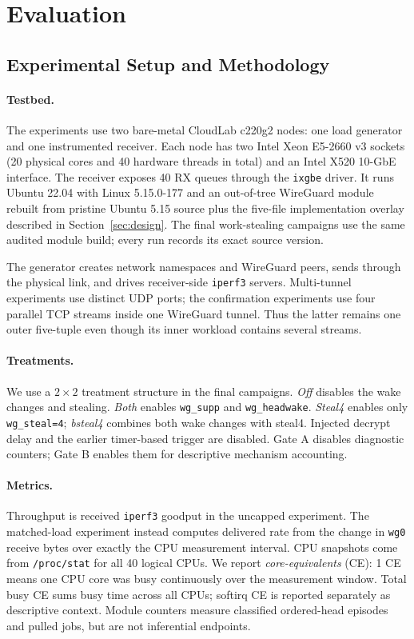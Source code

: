 \section{Evaluation}
\label{sec:evaluation}
\begingroup
\setlength{\emergencystretch}{1.5em}

\subsection{Experimental Setup and Methodology}
\label{sec:eval-method}

\paragraph{Testbed.}
The experiments use two bare-metal CloudLab c220g2 nodes: one load generator and
one instrumented receiver.  Each node has two Intel Xeon E5-2660 v3 sockets
(20 physical cores and 40 hardware threads in total) and an Intel X520 10-GbE
interface.  The receiver exposes 40 RX queues through the \texttt{ixgbe}
driver.  It runs Ubuntu 22.04 with Linux 5.15.0-177 and an out-of-tree
WireGuard module rebuilt from pristine Ubuntu 5.15 source plus the five-file
implementation overlay described in Section~\ref{sec:design}.  The final
work-stealing campaigns use the same audited module build; every run records
its exact source version.

The generator creates network namespaces and WireGuard peers, sends through the
physical link, and drives receiver-side \texttt{iperf3} servers.  Multi-tunnel
experiments use distinct UDP ports; the confirmation experiments use four
parallel TCP streams inside one WireGuard tunnel.  Thus the latter remains one
outer five-tuple even though its inner workload contains several streams.

\paragraph{Treatments.}
We use a $2\times2$ treatment structure in the final campaigns.  \emph{Off}
disables the wake changes and stealing.  \emph{Both} enables
\texttt{wg\_supp} and \texttt{wg\_headwake}.  \emph{Steal4} enables only
\texttt{wg\_steal=4}; \emph{bsteal4} combines both wake changes with steal4.
Injected decrypt delay and the earlier timer-based trigger are disabled.
Gate A disables diagnostic counters; Gate B enables them for descriptive
mechanism accounting.

\paragraph{Metrics.}
Throughput is received \texttt{iperf3} goodput in the uncapped experiment.
The matched-load experiment instead computes delivered rate from the change in
\texttt{wg0} receive bytes over exactly the CPU measurement interval.  CPU
snapshots come from \texttt{/proc/stat} for all 40 logical CPUs.  We report
\emph{core-equivalents} (CE): 1 CE means one CPU core was busy continuously
over the measurement window.  Total busy CE sums busy time across all CPUs;
softirq CE is reported separately as descriptive context.  Module counters
measure classified ordered-head episodes and pulled jobs, but are not
inferential endpoints.

